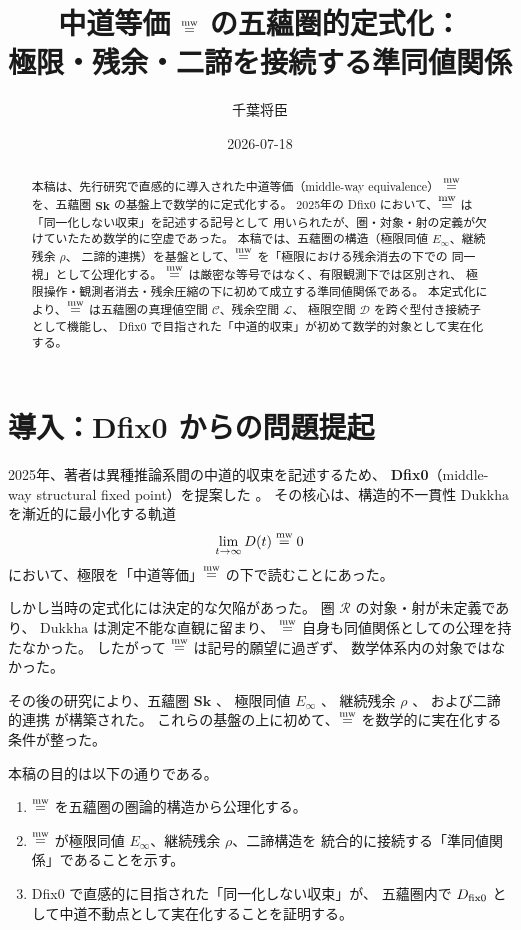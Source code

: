\documentclass[11pt,a4paper]{article}
\title{中道等価 $\mathrel{\overset{\mathrm{mw}}{=}}$ の五蘊圏的定式化：\\
       極限・残余・二諦を接続する準同値関係}
\author{千葉将臣}
\date{2026-07-18}
\theoremstyle{definition}
\newcommand{\Sk}{\mathbf{Sk}}
\newcommand{\C}{\mathcal{C}}
\newcommand{\Lspace}{\mathcal{L}}
\newcommand{\Dspace}{\mathcal{D}}
\begin{document}
\maketitle

\begin{abstract}
本稿は、先行研究で直感的に導入された中道等価（middle-way equivalence）
$\mathrel{\overset{\mathrm{mw}}{=}}$ を、五蘊圏 $\Sk$ の基盤上で数学的に定式化する。
2025年の Dfix0 において、$\mathrel{\overset{\mathrm{mw}}{=}}$ は「同一化しない収束」を記述する記号として
用いられたが、圏・対象・射の定義が欠けていたため数学的に空虚であった。
本稿では、五蘊圏の構造（極限同値 $E_\infty$、継続残余 $\rho$、
二諦的連携）を基盤として、$\mathrel{\overset{\mathrm{mw}}{=}}$ を「極限における残余消去の下での
同一視」として公理化する。
$\mathrel{\overset{\mathrm{mw}}{=}}$ は厳密な等号ではなく、有限観測下では区別され、
極限操作・観測者消去・残余圧縮の下に初めて成立する準同値関係である。
本定式化により、$\mathrel{\overset{\mathrm{mw}}{=}}$ は五蘊圏の真理値空間 $\C$、残余空間 $\Lspace$、
極限空間 $\Dspace$ を跨ぐ型付き接続子として機能し、
Dfix0 で目指された「中道的収束」が初めて数学的対象として実在化する。
\end{abstract}

\section{導入：Dfix0 からの問題提起}

2025年、著者は異種推論系間の中道的収束を記述するため、
\textbf{Dfix0}（middle-way structural fixed point）を提案した
\cite{Chiba2025dfix0}。
その核心は、構造的不一貫性 $\mathrm{Dukkha}$ を漸近的に最小化する軌道
\[
\lim_{t\to\infty} D(t) \mathrel{\overset{\mathrm{mw}}{=}} 0
\]
において、極限を「中道等価」$\mathrel{\overset{\mathrm{mw}}{=}}$ の下で読むことにあった。

しかし当時の定式化には決定的な欠陥があった。
圏 $\mathcal{R}$ の対象・射が未定義であり、
$\mathrm{Dukkha}$ は測定不能な直観に留まり、
$\mathrel{\overset{\mathrm{mw}}{=}}$ 自身も同値関係としての公理を持たなかった。
したがって $\mathrel{\overset{\mathrm{mw}}{=}}$ は記号的願望に過ぎず、
数学体系内の対象ではなかった。

その後の研究により、五蘊圏 $\Sk$ \cite{Chiba2026skandha}、
極限同値 $E_\infty$ \cite{Chiba2026einfty}、
継続残余 $\rho$ \cite{Chiba2026continuation}、
および二諦的連携 \cite{Chiba2026twotruths} が構築された。
これらの基盤の上に初めて、$\mathrel{\overset{\mathrm{mw}}{=}}$ を数学的に実在化する条件が整った。

本稿の目的は以下の通りである。
\begin{enumerate}[label=(\arabic*)]
  \item $\mathrel{\overset{\mathrm{mw}}{=}}$ を五蘊圏の圏論的構造から公理化する。
  \item $\mathrel{\overset{\mathrm{mw}}{=}}$ が極限同値 $E_\infty$、継続残余 $\rho$、二諦構造を
    統合的に接続する「準同値関係」であることを示す。
  \item Dfix0 で直感的に目指された「同一化しない収束」が、
    五蘊圏内で $D_{\mathrm{fix}0}$ として中道不動点として実在化することを証明する。
\end{enumerate}
\end{document}
